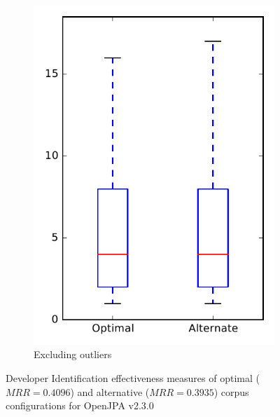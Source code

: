 \begin{figure}
\begin{subfigure}{.4\textwidth}
        \includegraphics[height=0.4\textheight]{figures/combo/dit_rq2_openjpa_no_outlier}
        \caption{Excluding outliers}\label{fig:combo:dit:rq2:openjpa_no_outlier}
    \end{subfigure}
\caption[Developer Identification effectiveness measures of optimal and alternative corpus configurations for OpenJPA v2.3.0]%
{Developer Identification effectiveness measures of optimal ($MRR=0.4096$) and alternative ($MRR=0.3935$) corpus configurations for OpenJPA v2.3.0}
\label{fig:combo:dit:rq2:openjpa}
\end{figure}

